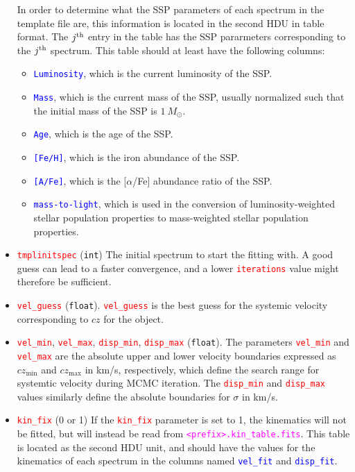 \documentclass[usenatbib,usegraphicx,useAMS,onecolumn]{mn2e}
\newcommand{\codeline}[1]{\lstinline|#1|}
\newcommand{\paramdef}[1]{\textcolor{red}{\codeline{#1}}}
\newcommand{\tblcol}[1]{\textcolor{blue}{\codeline{#1}}}
\newcommand{\fname}[1]{\textcolor{magenta}{\codeline{#1}}}
\begin{document}
\begin{itemize}
        In order to determine what the SSP parameters of each spectrum in the template file are, this information is located in the second HDU in table format.
        The $j^{\rm th}$ entry in the table has the SSP pararmeters corresponding to the $j^{\rm th}$ spectrum.
        This table should at least have the following columns:
        \begin{itemize}
            \item \tblcol{Luminosity}, which is the current luminosity of the SSP.
            \item \tblcol{Mass}, which is the current mass of the SSP, usually normalized such that the initial mass of the SSP is $1~M_{\odot}$.
            \item \tblcol{Age}, which is the age of the SSP.
            \item \tblcol{[Fe/H]}, which is the iron abundance of the SSP.
            \item \tblcol{[A/Fe]}, which is the [$\alpha$/Fe] abundance ratio of the SSP.
            \item \tblcol{mass-to-light}, which is used in the conversion of luminosity-weighted stellar population properties to mass-weighted stellar population properties.
        \end{itemize}
    \item \paramdef{tmplinitspec} (\texttt{int}) The initial spectrum to start the fitting with.
        A good guess can lead to a faster convergence, and a lower \paramdef{iterations} value might therefore be sufficient.
    \item \paramdef{vel_guess} (\texttt{float}). \paramdef{vel_guess} is the best guess for the systemic velocity corresponding to $cz$ for the object. 
    \item \paramdef{vel_min}, \paramdef{vel_max}, \paramdef{disp_min}, \paramdef{disp_max} (\texttt{float}).
        The parameters \paramdef{vel_min} and \paramdef{vel_max} are the absolute upper and lower velocity boundaries expressed as $cz_\mathrm{min}$ and $cz_\mathrm{max}$ in km/s, respectively, which define the search range for systemtic velocity during MCMC iteration. The \paramdef{disp_min} and \paramdef{disp_max} values similarly define the absolute boundaries for $\sigma$ in km/s.
    \item \paramdef{kin_fix} (0 or 1)
        If the \paramdef{kin_fix} parameter is set to 1, the kinematics will not be fitted, but will instead be read from \fname{<prefix>.kin_table.fits}.
        This table is located as the second HDU unit, and should have the values for the kinematics of each spectrum in the columns named \tblcol{vel_fit} and \tblcol{disp_fit}.

\end{itemize}
\end{document}
